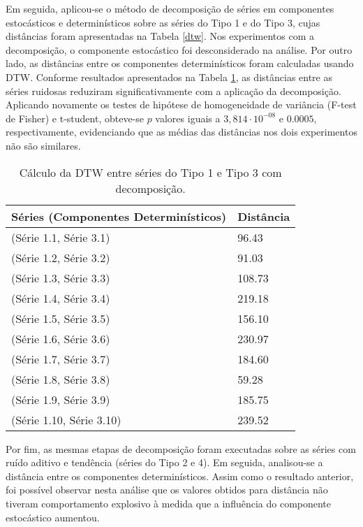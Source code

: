Em seguida, aplicou-se o método de decomposição de séries em componentes estocásticos e determinísticos sobre as séries do Tipo 1 e do Tipo 3, cujas distâncias foram apresentadas na Tabela \ref{dtw}. Nos experimentos com a decomposição, o componente estocástico foi desconsiderado na análise. Por outro lado, as distâncias entre os componentes determinísticos foram calculadas usando DTW. Conforme resultados apresentados na Tabela \ref{dtwcompor}, as distâncias entre as séries ruidosas reduziram significativamente com a aplicação da decomposição. Aplicando novamente os testes de hipótese de homogeneidade de variância (F-test de Fisher) e t-student, obteve-se $p$ valores iguais a $3,814 \cdot 10^{-08}$ e $0.0005$, respectivamente, evidenciando que as médias das distâncias nos dois experimentos não são similares.

\begin{table}[!ht]
\centering
\caption{Cálculo da DTW entre séries do Tipo 1 e Tipo 3 com decomposição.}
\begin{tabular}{ll}
  \hline
  Séries (Componentes Determinísticos) & Distância \\
  \hline
  \hline
(Série 1.1, Série 3.1) & 96.43 \\ 
(Série 1.2, Série 3.2) & 91.03 \\
(Série 1.3, Série 3.3) & 108.73\\ 
(Série 1.4, Série 3.4) & 219.18  \\ 
(Série 1.5, Série 3.5) & 156.10 \\
(Série 1.6, Série 3.6) & 230.97 \\
(Série 1.7, Série 3.7) & 184.60 \\
(Série 1.8, Série 3.8)& 59.28 \\ 
(Série 1.9, Série 3.9) & 185.75 \\
(Série 1.10, Série 3.10) &  239.52 \\ 
   \hline
\end{tabular}
\label{dtwcompor}
\end{table}

Por fim, as mesmas etapas de decomposição foram executadas sobre as séries com ruído aditivo e tendência (séries do Tipo 2 e 4). Em seguida, analisou-se a distância entre os componentes determinísticos. Assim como o resultado anterior, foi possível observar nesta análise que os valores obtidos para distância não tiveram comportamento explosivo à medida que a influência do componente estocástico aumentou. 




